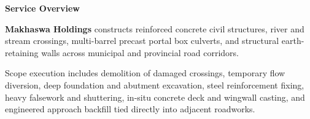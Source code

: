\documentclass[a4paper,11pt]{article}
\begin{document}
\noindent
\begin{minipage}[t]{0.63\textwidth}
    \vspace{0pt}
    {\large\bfseries\color{mhnavy} Service Overview}
    \vspace{0.08cm}

    {\fontsize{8.7pt}{12.3pt}\selectfont\color{mhtext}
    \textbf{Makhaswa Holdings} constructs reinforced concrete civil structures, river and stream crossings, multi-barrel precast portal box culverts, and structural earth-retaining walls across municipal and provincial road corridors.
    }

    \vspace{0.15cm}

    {\fontsize{8.7pt}{12.3pt}\selectfont\color{mhtext}
    Scope execution includes demolition of damaged crossings, temporary flow diversion, deep foundation and abutment excavation, steel reinforcement fixing, heavy falsework and shuttering, in-situ concrete deck and wingwall casting, and engineered approach backfill tied directly into adjacent roadworks.
    }
\end{minipage}
\hfill
\end{document}
